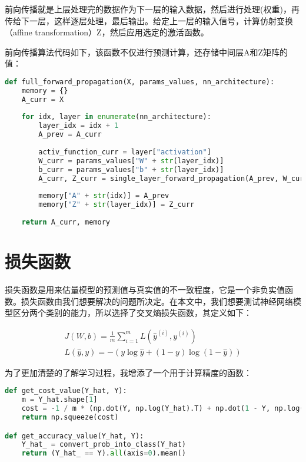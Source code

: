 前向传播就是上层处理完的数据作为下一层的输入数据，然后进行处理(权重)，再传给下一层，这样逐层处理，最后输出。给定上一层的输入信号，计算仿射变换（affine transformation）Z，然后应用选定的激活函数。

前向传播算法代码如下，该函数不仅进行预测计算，还存储中间层A和Z矩阵的值：

\begin{lstlisting}[language=python, breaklines]
def full_forward_propagation(X, params_values, nn_architecture):
    memory = {}
    A_curr = X
    
    for idx, layer in enumerate(nn_architecture):
        layer_idx = idx + 1
        A_prev = A_curr
        
        activ_function_curr = layer["activation"]
        W_curr = params_values["W" + str(layer_idx)]
        b_curr = params_values["b" + str(layer_idx)]
        A_curr, Z_curr = single_layer_forward_propagation(A_prev, W_curr, b_curr, activ_function_curr)
        
        memory["A" + str(idx)] = A_prev
        memory["Z" + str(layer_idx)] = Z_curr
       
    return A_curr, memory
\end{lstlisting}

\section{损失函数}

损失函数是用来估量模型的预测值与真实值的不一致程度，它是一个非负实值函数。损失函数由我们想要解决的问题所决定。在本文中，我们想要测试神经网络模型区分两个类别的能力，所以选择了交叉熵损失函数，其定义如下：

\begin{align*}
    J(W, b) = \frac{1}{m}\sum_{i=1}^m L(\hat{y}^{(i)},y^{(i)}) \\
    L(\hat{y},y)=-(y\log \hat{y} + (1-y)\log(1-\hat{y}))
\end{align*}

为了更加清楚的了解学习过程，我增添了一个用于计算精度的函数：

\begin{lstlisting}[language=python, breaklines]
def get_cost_value(Y_hat, Y):
    m = Y_hat.shape[1]
    cost = -1 / m * (np.dot(Y, np.log(Y_hat).T) + np.dot(1 - Y, np.log(1 - Y_hat).T))
    return np.squeeze(cost)

def get_accuracy_value(Y_hat, Y):
    Y_hat_ = convert_prob_into_class(Y_hat)
    return (Y_hat_ == Y).all(axis=0).mean()
\end{lstlisting}

